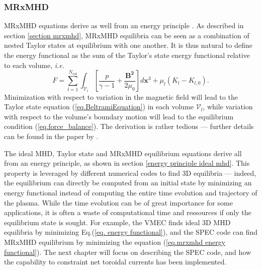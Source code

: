 \documentclass[my_thesis.tex]{subfiles}
\begin{document}
\subsubsection{MRxMHD} \label{energy principle mrxmhd}
MRxMHD equations derive as well from an energy principle \citep{Dewar2015}. As described in section \ref{section mrxmhd}, MRxMHD equilibria can be seen as a combination of nested Taylor states at equilibrium with one another. It is thus natural to define the energy functional as the sum of the Taylor's state energy functional relative to each volume, \textit{i.e.}
\begin{equation}
	F = \sum_{l=1}^{N_{vol}} \int_{\mathcal{V}_l} \left[\frac{p}{\gamma-1}+\frac{\mathbf{B^2}}{2\mu_0}\right]d\mathbf{x}^3 + \mu_l(K_l-K_{l,0}). \label{eq.mrxmhd energy functional}
\end{equation}
Minimization with respect to variation in the magnetic field will lead to the Taylor state equation (\ref{eq.BeltramiEquation}) in each volume $\mathcal{V}_l$, while variation with respect to the volume's boundary motion will lead to the equilibrium condition (\ref{eq.force_balance}). The derivation is rather tedious --- further details can be found in the paper by \citet{Dewar2015}.

The ideal MHD, Taylor state and MRxMHD equilibrium equations derive all from an energy principle, as shown in section \ref{energy principle ideal mhd}. This property is leveraged by different numerical codes to find 3D equilibria --- indeed, the equilibrium can directly be computed from an initial state by minimizing an energy functional instead of computing the entire time evolution and trajectory of the plasma. While the time evolution can be of great importance for some applications, it is often a waste of computational time and ressources if only the equilibrium state is sought. For example, the \ac{VMEC} \citep{Hirshman1983,Hirshman1986} finds ideal 3D MHD equilibria by minimizing Eq.(\ref{eq. energy functional}), and the \ac{SPEC} code \citep{hudsonComputationMultiregionRelaxed2012,Hudson2020c} can find MRxMHD equilibrium by minimizing the equation (\ref{eq.mrxmhd energy functional}). The next chapter will focus on describing the \ac{SPEC} code, and how the capability to constraint net toroidal currents has been implemented.




\end{document}
